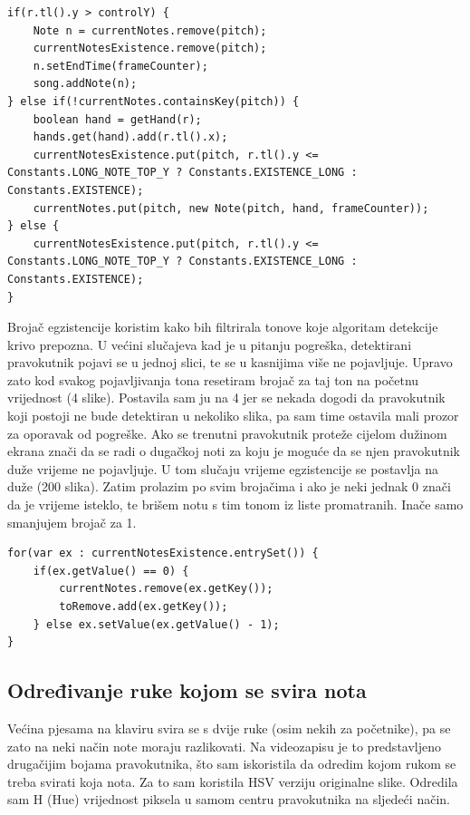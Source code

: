 \documentclass[times, utf8, zavrsni, numeric]{fer}
\begin{document}
\begin{lstlisting}
if(r.tl().y > controlY) {
	Note n = currentNotes.remove(pitch);
	currentNotesExistence.remove(pitch);
	n.setEndTime(frameCounter);
	song.addNote(n);
} else if(!currentNotes.containsKey(pitch)) {
	boolean hand = getHand(r);
	hands.get(hand).add(r.tl().x);
	currentNotesExistence.put(pitch, r.tl().y <= Constants.LONG_NOTE_TOP_Y ? Constants.EXISTENCE_LONG : Constants.EXISTENCE);
	currentNotes.put(pitch, new Note(pitch, hand, frameCounter));
} else {
	currentNotesExistence.put(pitch, r.tl().y <= Constants.LONG_NOTE_TOP_Y ? Constants.EXISTENCE_LONG : Constants.EXISTENCE);
}
\end{lstlisting}

Brojač egzistencije koristim kako bih filtrirala tonove koje algoritam detekcije krivo prepozna. U većini slučajeva kad je u pitanju pogreška, detektirani pravokutnik pojavi se u jednoj slici, te se u kasnijima više ne pojavljuje. Upravo zato kod svakog pojavljivanja tona resetiram brojač za taj ton na početnu vrijednost (4 slike). Postavila sam ju na 4 jer se nekada dogodi da pravokutnik koji postoji ne bude detektiran u nekoliko slika, pa sam time ostavila mali prozor za oporavak od pogreške. Ako se trenutni pravokutnik proteže cijelom dužinom ekrana znači da se radi o dugačkoj noti za koju je moguće da se njen pravokutnik duže vrijeme ne pojavljuje. U tom slučaju vrijeme egzistencije se postavlja na duže (200 slika). Zatim prolazim po svim brojačima i ako je neki jednak 0 znači da je vrijeme isteklo, te brišem notu s tim tonom iz liste promatranih. Inače samo smanjujem brojač za 1.

\begin{lstlisting}
for(var ex : currentNotesExistence.entrySet()) {
	if(ex.getValue() == 0) {
		currentNotes.remove(ex.getKey());
		toRemove.add(ex.getKey());
	} else ex.setValue(ex.getValue() - 1);
}
\end{lstlisting}

\subsection{Određivanje ruke kojom se svira nota}
Većina pjesama na klaviru svira se s dvije ruke (osim nekih za početnike), pa se zato na neki način note moraju razlikovati. Na videozapisu je to predstavljeno drugačijim bojama pravokutnika, što sam iskoristila da odredim kojom rukom se treba svirati koja nota. Za to sam koristila HSV verziju originalne slike. Odredila sam H (Hue) vrijednost piksela u samom centru pravokutnika na sljedeći način.
\end{document}

